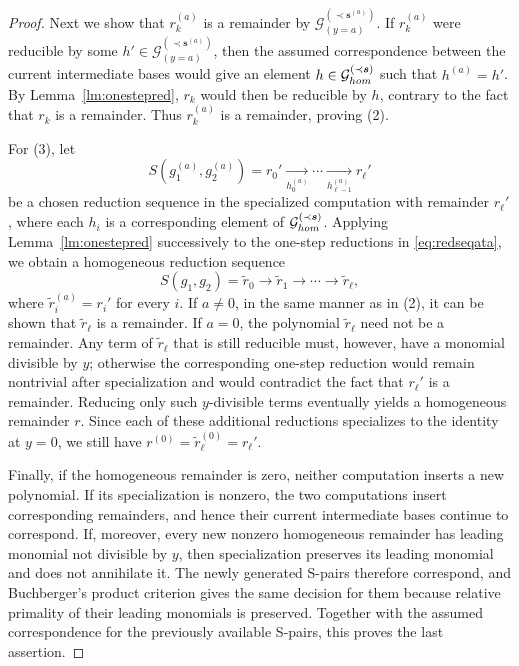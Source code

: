\documentclass[10pt,a4paper]{amsart}
\begin{document}
\begin{proof}
Next we show that $r_k^{(a)}$ is a remainder by $\mathcal{G}^{(\prec \bm{s}^{(a)})}_{(y=a)}$.
If $r_k^{(a)}$ were reducible by some $h'\in\mathcal{G}^{(\prec \bm{s}^{(a)})}_{(y=a)}$, then the assumed correspondence between the current intermediate bases would give an element $h\in\mathcal{G}^{(\prec \bm{s})}_{\rm hom}$ such that $h^{(a)}=h'$.
By Lemma~\ref{lm:onestepred}, $r_k$ would then be reducible by $h$, contrary to the fact that $r_k$ is a remainder.
Thus $r_k^{(a)}$ is a remainder, proving {\rm (2)}.

\medskip

For {\rm (3)}, let
\begin{equation}\label{eq:redseqata}
S(g_1^{(a)},g_2^{(a)})=r_0' \xrightarrow[h_0^{(a)}]{} \cdots \xrightarrow[h_{\ell-1}^{(a)}]{} r_\ell'
\end{equation}
be a chosen reduction sequence in the specialized computation with remainder $r_\ell'$, where each $h_i$ is a corresponding element of $\mathcal{G}^{(\prec \bm{s})}_{\rm hom}$.
Applying Lemma~\ref{lm:onestepred} successively to the one-step reductions in \eqref{eq:redseqata}, we obtain a homogeneous reduction sequence
\begin{equation}\label{eq:redseqhom}
S(g_1,g_2)= \widetilde r_0 \longrightarrow \widetilde r_1 \longrightarrow \cdots \longrightarrow \widetilde r_\ell,
\end{equation}
where $\widetilde r_i^{(a)}=r_i'$ for every $i$.
If $a\neq0$, in the same manner as in (2), it can be shown that $\widetilde r_\ell$ is a remainder.
If $a=0$, the polynomial $\widetilde r_\ell$ need not be a remainder.
Any term of $\widetilde r_\ell$ that is still reducible must, however, have a monomial divisible by $y$; otherwise the corresponding one-step reduction would remain nontrivial after specialization and would contradict the fact that $r_\ell'$ is a remainder.
Reducing only such $y$-divisible terms eventually yields a homogeneous remainder $r$.
Since each of these additional reductions specializes to the identity at $y=0$, we still have $r^{(0)}= \widetilde r_\ell^{(0)}= r_\ell'$.

\medskip

Finally, if the homogeneous remainder is zero, neither computation inserts a new polynomial.
If its specialization is nonzero, the two computations insert corresponding remainders, and hence their current intermediate bases continue to correspond.
If, moreover, every new nonzero homogeneous remainder has leading monomial not divisible by $y$, then specialization preserves its leading monomial and does not annihilate it.
The newly generated S-pairs therefore correspond, and Buchberger's product criterion gives the same decision for them because relative primality of their leading monomials is preserved.
Together with the assumed correspondence for the previously available S-pairs, this proves the last assertion.
\end{proof}
\end{document}
